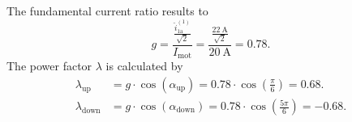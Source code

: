 \begin{solutionblock}
    The fundamental current ratio results to
    \begin{equation}
        g=\frac{\frac{\hat{i}_\mathrm{1a}^\mathrm{(1)}}{\sqrt{2}}}{I_\mathrm{mot}}=\frac{\frac{\SI{22}{\ampere}}{\sqrt{2}}}{\SI{20}{\ampere}}=0.78.
    \end{equation}
    The power factor $\lambda$ is calculated by
    \begin{equation}
        \begin{split}
            \lambda_\mathrm{up}&=g \cdot \cos{(\alpha_\mathrm{up})}=0.78  \cdot \cos(\frac{\pi}{6})= 0.68. \\
            \lambda_\mathrm{down}&=g \cdot \cos{(\alpha_\mathrm{down})}=0.78  \cdot \cos(\frac{5\pi}{6})= -0.68.
        \end{split}
    \end{equation}
\end{solutionblock}
